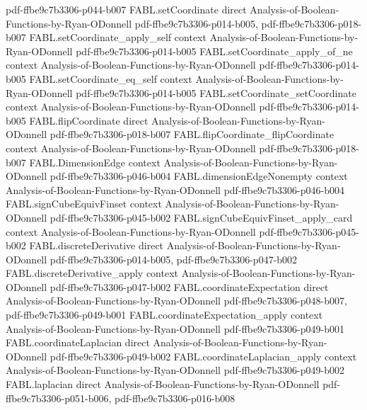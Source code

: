 \begin{theorem}
  {pdf-ffbe9c7b3306-p044-b007}
\proofstep
  {FABL.setCoordinate}
  {direct}
  {Analysis-of-Boolean-Functions-by-Ryan-ODonnell}
  {pdf-ffbe9c7b3306-p014-b005,
    pdf-ffbe9c7b3306-p018-b007}
\proofstep
  {FABL.setCoordinate_apply_self}
  {context}
  {Analysis-of-Boolean-Functions-by-Ryan-ODonnell}
  {pdf-ffbe9c7b3306-p014-b005}
\proofstep
  {FABL.setCoordinate_apply_of_ne}
  {context}
  {Analysis-of-Boolean-Functions-by-Ryan-ODonnell}
  {pdf-ffbe9c7b3306-p014-b005}
\proofstep
  {FABL.setCoordinate_eq_self}
  {context}
  {Analysis-of-Boolean-Functions-by-Ryan-ODonnell}
  {pdf-ffbe9c7b3306-p014-b005}
\proofstep
  {FABL.setCoordinate_setCoordinate}
  {context}
  {Analysis-of-Boolean-Functions-by-Ryan-ODonnell}
  {pdf-ffbe9c7b3306-p014-b005}
\proofstep
  {FABL.flipCoordinate}
  {direct}
  {Analysis-of-Boolean-Functions-by-Ryan-ODonnell}
  {pdf-ffbe9c7b3306-p018-b007}
\proofstep
  {FABL.flipCoordinate_flipCoordinate}
  {context}
  {Analysis-of-Boolean-Functions-by-Ryan-ODonnell}
  {pdf-ffbe9c7b3306-p018-b007}
\proofstep
  {FABL.DimensionEdge}
  {context}
  {Analysis-of-Boolean-Functions-by-Ryan-ODonnell}
  {pdf-ffbe9c7b3306-p046-b004}
\proofstep
  {FABL.dimensionEdgeNonempty}
  {context}
  {Analysis-of-Boolean-Functions-by-Ryan-ODonnell}
  {pdf-ffbe9c7b3306-p046-b004}
\proofstep
  {FABL.signCubeEquivFinset}
  {context}
  {Analysis-of-Boolean-Functions-by-Ryan-ODonnell}
  {pdf-ffbe9c7b3306-p045-b002}
\proofstep
  {FABL.signCubeEquivFinset_apply_card}
  {context}
  {Analysis-of-Boolean-Functions-by-Ryan-ODonnell}
  {pdf-ffbe9c7b3306-p045-b002}
\proofstep
  {FABL.discreteDerivative}
  {direct}
  {Analysis-of-Boolean-Functions-by-Ryan-ODonnell}
  {pdf-ffbe9c7b3306-p014-b005,
    pdf-ffbe9c7b3306-p047-b002}
\proofstep
  {FABL.discreteDerivative_apply}
  {context}
  {Analysis-of-Boolean-Functions-by-Ryan-ODonnell}
  {pdf-ffbe9c7b3306-p047-b002}
\proofstep
  {FABL.coordinateExpectation}
  {direct}
  {Analysis-of-Boolean-Functions-by-Ryan-ODonnell}
  {pdf-ffbe9c7b3306-p048-b007,
    pdf-ffbe9c7b3306-p049-b001}
\proofstep
  {FABL.coordinateExpectation_apply}
  {context}
  {Analysis-of-Boolean-Functions-by-Ryan-ODonnell}
  {pdf-ffbe9c7b3306-p049-b001}
\proofstep
  {FABL.coordinateLaplacian}
  {direct}
  {Analysis-of-Boolean-Functions-by-Ryan-ODonnell}
  {pdf-ffbe9c7b3306-p049-b002}
\proofstep
  {FABL.coordinateLaplacian_apply}
  {context}
  {Analysis-of-Boolean-Functions-by-Ryan-ODonnell}
  {pdf-ffbe9c7b3306-p049-b002}
\proofstep
  {FABL.laplacian}
  {direct}
  {Analysis-of-Boolean-Functions-by-Ryan-ODonnell}
  {pdf-ffbe9c7b3306-p051-b006,
    pdf-ffbe9c7b3306-p016-b008}

\end{theorem}
